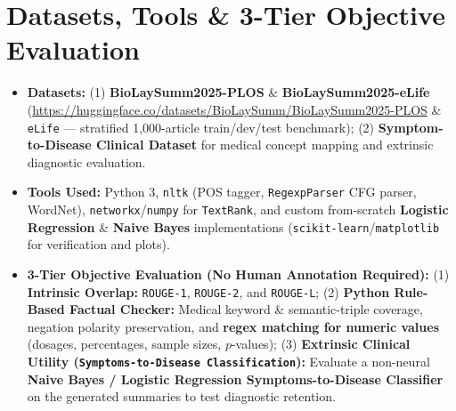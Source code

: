 \documentclass[11pt,a4paper]{article}
\begin{document}
\section{Datasets, Tools \& 3-Tier Objective Evaluation}
\begin{itemize}
    \item \textbf{Datasets:} (1) \textbf{BioLaySumm2025-PLOS} \& \textbf{BioLaySumm2025-eLife} (\url{https://huggingface.co/datasets/BioLaySumm/BioLaySumm2025-PLOS} \& \texttt{eLife} --- stratified 1,000-article train/dev/test benchmark); (2) \textbf{Symptom-to-Disease Clinical Dataset} for medical concept mapping and extrinsic diagnostic evaluation.
    \item \textbf{Tools Used:} Python 3, \texttt{nltk} (POS tagger, \texttt{RegexpParser} CFG parser, WordNet), \texttt{networkx}/\texttt{numpy} for \texttt{TextRank}, and custom from-scratch \textbf{Logistic Regression} \& \textbf{Naive Bayes} implementations (\texttt{scikit-learn}/\texttt{matplotlib} for verification and plots).
    \item \textbf{3-Tier Objective Evaluation (No Human Annotation Required):} (1) \textbf{Intrinsic Overlap:} \texttt{ROUGE-1}, \texttt{ROUGE-2}, and \texttt{ROUGE-L}; (2) \textbf{Python Rule-Based Factual Checker:} Medical keyword \& semantic-triple coverage, negation polarity preservation, and \textbf{regex matching for numeric values} (dosages, percentages, sample sizes, $p$-values); (3) \textbf{Extrinsic Clinical Utility (\texttt{Symptoms-to-Disease Classification}):} Evaluate a non-neural \textbf{Naive Bayes / Logistic Regression Symptoms-to-Disease Classifier} on the generated summaries to test diagnostic retention.
\end{itemize}
\end{document}
